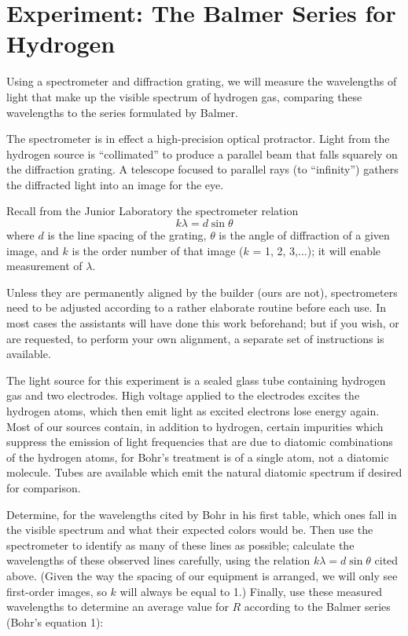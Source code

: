 \section*{Experiment: The Balmer Series for Hydrogen}

Using a spectrometer and diffraction grating, we will measure the
wavelengths of light that make up the visible spectrum of hydrogen gas,
comparing these wavelengths to the series formulated by Balmer.

The spectrometer is in effect a high-precision optical protractor. Light
from the hydrogen source is ``collimated'' to produce a parallel beam
that falls squarely on the diffraction grating. A telescope focused to
parallel rays (to ``infinity'') gathers the diffracted light into an
image for the eye.

Recall from the Junior Laboratory the spectrometer relation
%
\begin{equation*}
k\lambda = d \sin \theta
\end{equation*}
%
where $d$ is the line spacing of the grating, $\theta$ is the angle
of diffraction of a given image, and $k$ is the order number of
that image ($k$ = 1, 2, 3,...); it will enable measurement of
$\lambda$.

Unless they are permanently aligned by the builder (ours are not),
spectrometers need to be adjusted according to a rather elaborate
routine before each use. In most cases the assistants will have done
this work beforehand; but if you wish, or are requested, to perform your
own alignment, a separate set of instructions is available.

The light source for this experiment is a sealed glass tube containing
hydrogen gas and two electrodes. High voltage applied to the electrodes
excites the hydrogen atoms, which then emit light as excited electrons
lose energy again. Most of our sources contain, in addition to hydrogen,
certain impurities which suppress the emission of light frequencies that
are due to diatomic combinations of the hydrogen atoms, for Bohr's
treatment is of a single atom, not a diatomic molecule. Tubes are
available which emit the natural diatomic spectrum if desired for
comparison.

Determine, for the wavelengths cited by Bohr in his first table, which
ones fall in the visible spectrum and what their expected colors would
be. Then use the spectrometer to identify as many of these lines as
possible; calculate the wavelengths of these observed lines carefully,
using the relation $k\lambda = d \sin \theta$ cited above. (Given the way 
the spacing of our equipment is arranged, we will only see first-order images,
so $k$ will always be equal to 1.)  Finally, use these measured wavelengths 
to determine an average value for $R$ according to the Balmer series (Bohr's equation 1):

